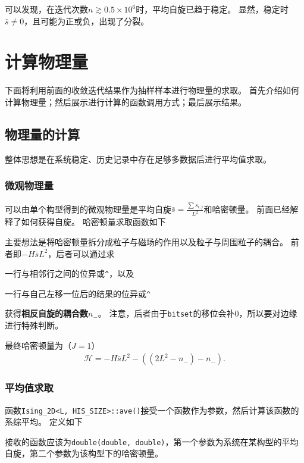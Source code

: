 \documentclass[a4paper,unicode]{report}
\begin{document}
可以发现，在迭代次数$n\gtrsim 0.5\times 10^6$时，平均自旋已趋于稳定。
显然，稳定时$\bar{s}\neq 0$，且可能为正或负，出现了分裂。

\section{计算物理量}
下面将利用前面的收敛迭代结果作为抽样样本进行物理量的求取。
首先介绍如何计算物理量；然后展示进行计算的函数调用方式；最后展示结果。

\subsection{物理量的计算}
整体思想是在系统稳定、历史记录中存在足够多数据后进行平均值求取。

\subsubsection{微观物理量}
可以由单个构型得到的微观物理量是平均自旋$\bar{s} = \frac{\sum s_{i,j}}{L^2}$和哈密顿量。
前面已经解释了如何获得自旋。
哈密顿量求取函数如下
{
    \linespread{1.0}
    
}
主要想法是将哈密顿量拆分成粒子与磁场的作用以及粒子与周围粒子的耦合。
前者即$-H\bar{s}L^2$，后者可以通过求 \begin{inparaenum}
    \item 一行与相邻行之间的位异或\verb|^|，以及
    \item 一行与自己左移一位后的结果的位异或\verb|^|
\end{inparaenum}
获得\textbf{相反自旋的耦合数}$n_-$。
注意，后者由于\verb|bitset|的移位会补0，所以要对边缘进行特殊判断。

最终哈密顿量为（$J=1$）
\begin{eqnarray}
    \mathcal{H} = -H\bar{s}L^2 - ((2L^2-n_-) - n_-).
\end{eqnarray}

\subsubsection{平均值求取}
函数\verb|Ising_2D<L, HIS_SIZE>::ave()|接受一个函数作为参数，然后计算该函数的系综平均。
定义如下
{
    \linespread{1.0}
    
}

接收的函数应该为\verb|double(double, double)|，第一个参数为系统在某构型的平均自旋，第二个参数为该构型下的哈密顿量。
\end{document}
